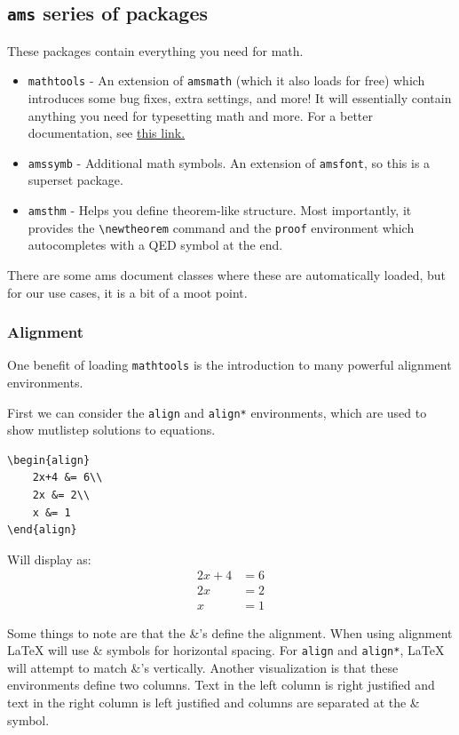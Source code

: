 \documentclass[twocolumn]{article}
\begin{document}
\subsection{\texttt{ams} series of packages}
These packages contain everything you need for math.
\begin{itemize}
    \item \texttt{mathtools} - An extension of \verb|amsmath| (which it also loads for free) which introduces some bug fixes, extra settings, and more! It will essentially contain anything you need for typesetting math and more. For a better documentation, see \href{https://www.overleaf.com/learn/latex/Articles/Mathtools_-_for_beautiful_math}{this link.}
    \item \texttt{amssymb} - Additional math symbols. An extension of \verb|amsfont|, so this is a superset package.
    \item \texttt{amsthm} - Helps you define theorem-like structure. Most importantly, it provides the \verb|\newtheorem| command and the \verb|proof| environment which autocompletes with a QED symbol at the end.
\end{itemize}
There are some ams document classes where these are automatically loaded, but for our use cases, it is a bit of a moot point.

\subsubsection{Alignment}
One benefit of loading \verb|mathtools| is the introduction to many powerful alignment environments.

First we can consider the \verb|align| and \verb|align*| environments, which are used to show mutlistep solutions to equations.
\begin{verbatim}
\begin{align}
    2x+4 &= 6\\
    2x &= 2\\
    x &= 1
\end{align}  
\end{verbatim}
\noindent Will display as:
\begin{align}
    2x+4 &= 6\\
    2x &= 2\\
    x &= 1
\end{align}

Some things to note are that the \&'s define the alignment. When using alignment LaTeX will use \& symbols for horizontal spacing. For \verb|align| and \verb|align*|, LaTeX will attempt to match \&'s vertically. Another visualization is that these environments define two columns. Text in the left column is right justified and text in the right column is left justified and columns are separated at the \& symbol.
\end{document}
